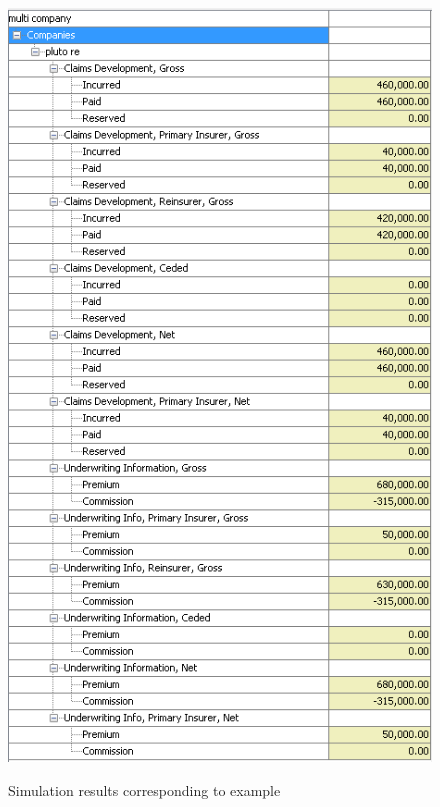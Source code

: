 {\begin{figure}[htb]
{\includegraphics[scale=0.6]{images/examplePlutoRe.png}}
\caption{Simulation results corresponding to example}
\label{fig:resultsMarsPluto}
\end{figure}


}

